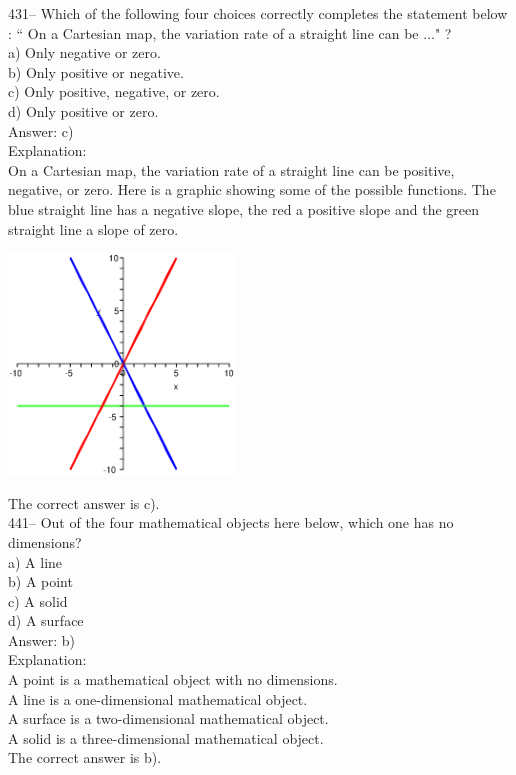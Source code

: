 \documentclass[letterpaper, 12pt]{article}
\begin{document}
431-- Which of the following four choices correctly completes the statement below : `` On a Cartesian map, the variation rate of a straight line can be $\ldots$" ?\\

a) Only negative or zero.\\
b) Only positive or negative.\\
c) Only positive, negative, or zero.\\
d) Only positive or zero.\\


Answer:  c)\\

Explanation: \\
On a Cartesian map, the variation rate of a straight line can be positive, negative, or zero.
Here is a graphic showing some of the possible functions. The blue straight line has a negative slope,
the red a positive slope and the green straight line a slope of zero.\\
    \begin{center}
    \includegraphics[width=6cm,bb=0 0 400 400]{fonction17.eps}
    \end{center}

The correct answer is c).\\



441-- Out of the four mathematical objects here below, which one has no dimensions?\\

a) A line\\
b) A point\\
c) A solid\\
d) A surface\\

Answer: b)\\

Explanation: \\
A point is a mathematical object with no dimensions.\\
A line is a one-dimensional mathematical object.\\
A surface is a two-dimensional mathematical object.\\
A solid is a three-dimensional mathematical object.\\
The correct answer is b).\\
\end{document}
